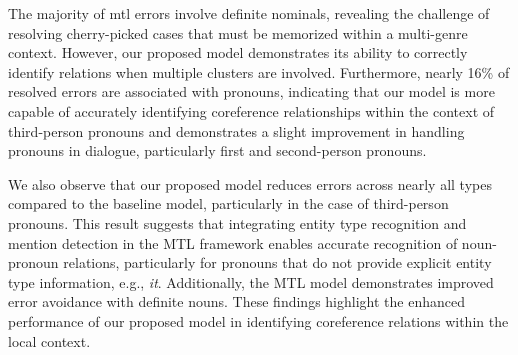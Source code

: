 \documentclass[11pt]{article}
\begin{document}
\begin{table}[t!bh]
\centering\small
{}
    \caption{Number and percentage of errors by class that are produced by e2e but avoided by the MTL model (e2e errors) and produced by the MTL model but resolved by the e2e model (mtl errors).}
    \label{tab:quant_error}
\end{table}


The majority of mtl errors involve definite nominals, revealing the challenge of resolving cherry-picked cases that must be memorized within a multi-genre context. However, our proposed model demonstrates its ability to correctly identify relations when multiple clusters are involved. Furthermore, nearly 16\% of resolved errors are associated with pronouns, indicating that our model is more capable of accurately identifying coreference relationships within the context of third-person pronouns and demonstrates a slight improvement in handling pronouns in dialogue, particularly first and second-person pronouns.

We also observe that our proposed model reduces errors across nearly all types compared to the baseline model, particularly in the case of third-person pronouns. This result suggests that integrating entity type recognition and mention detection in the MTL framework enables accurate recognition of noun-pronoun relations, particularly for pronouns that do not provide explicit entity type information, e.g., \textit{it}. Additionally, the MTL model demonstrates improved error avoidance with definite nouns. These findings highlight the enhanced performance of our proposed model in identifying coreference relations within the local context.
\end{document}
